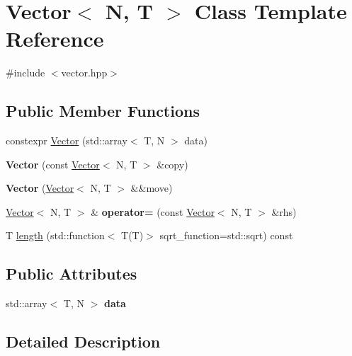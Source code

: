\hypertarget{class_vector}{}\section{Vector$<$ N, T $>$ Class Template Reference}
\label{class_vector}


{\ttfamily \#include $<$vector.\+hpp$>$}

\subsection*{Public Member Functions}
\begin{DoxyCompactItemize}
\item 
constexpr \mbox{\hyperlink{class_vector_abae6eb6eff55acb2894297c9f734c2d9}{Vector}} (std\+::array$<$ T, N $>$ data)
\item 
\mbox{\label{class_vector_a419b12d187f250ac7fa9a94ec903f210}} 
{\bfseries Vector} (const \mbox{\hyperlink{class_vector}{Vector}}$<$ N, T $>$ \&copy)
\item 
\mbox{\label{class_vector_a1a62e62b04841a8a8a68f70f99c8c1b9}} 
{\bfseries Vector} (\mbox{\hyperlink{class_vector}{Vector}}$<$ N, T $>$ \&\&move)
\item 
\mbox{\label{class_vector_a895d481d7672a14c2fe72803cd7c5668}} 
\mbox{\hyperlink{class_vector}{Vector}}$<$ N, T $>$ \& {\bfseries operator=} (const \mbox{\hyperlink{class_vector}{Vector}}$<$ N, T $>$ \&rhs)
\item 
T \mbox{\hyperlink{class_vector_ae8a43ee89f0a311a44711db03c1ddb4b}{length}} (std\+::function$<$ T(T)$>$ sqrt\+\_\+function=std\+::sqrt) const
\end{DoxyCompactItemize}
\subsection*{Public Attributes}
\begin{DoxyCompactItemize}
\item 
\mbox{\label{class_vector_a8d06c36075458e4fd7ca17ba171ac549}} 
std\+::array$<$ T, N $>$ {\bfseries data}
\end{DoxyCompactItemize}


\subsection{Detailed Description}

